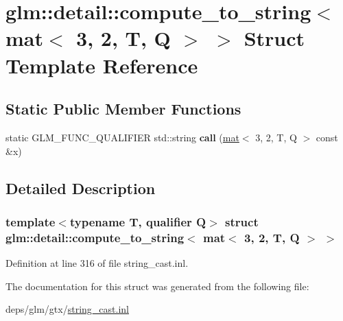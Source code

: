 \hypertarget{structglm_1_1detail_1_1compute__to__string_3_01mat_3_013_00_012_00_01T_00_01Q_01_4_01_4}{}\section{glm\+:\+:detail\+:\+:compute\+\_\+to\+\_\+string$<$ mat$<$ 3, 2, T, Q $>$ $>$ Struct Template Reference}
\label{structglm_1_1detail_1_1compute__to__string_3_01mat_3_013_00_012_00_01T_00_01Q_01_4_01_4}
\subsection*{Static Public Member Functions}
\begin{DoxyCompactItemize}
\item 
\mbox{\label{structglm_1_1detail_1_1compute__to__string_3_01mat_3_013_00_012_00_01T_00_01Q_01_4_01_4_a1d5c4ef4e4daf9c8f5c0b85f098d0efd}} 
static G\+L\+M\+\_\+\+F\+U\+N\+C\+\_\+\+Q\+U\+A\+L\+I\+F\+I\+ER std\+::string {\bfseries call} (\hyperlink{structglm_1_1mat}{mat}$<$ 3, 2, T, Q $>$ const \&x)
\end{DoxyCompactItemize}


\subsection{Detailed Description}
\subsubsection*{template$<$typename T, qualifier Q$>$\newline
struct glm\+::detail\+::compute\+\_\+to\+\_\+string$<$ mat$<$ 3, 2, T, Q $>$ $>$}



Definition at line 316 of file string\+\_\+cast.\+inl.



The documentation for this struct was generated from the following file\+:\begin{DoxyCompactItemize}
\item 
deps/glm/gtx/\hyperlink{string__cast_8inl}{string\+\_\+cast.\+inl}\end{DoxyCompactItemize}
